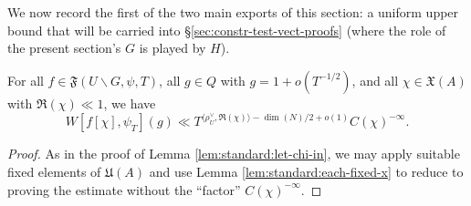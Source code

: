 We now record the first of the two main exports of this section: a uniform upper bound that will be carried into \S\ref{sec:constr-test-vect-proofs} (where the role of the present section's $G$ is played by $H$).
\begin{proposition}\label{lem:all-f-in}
  For all $f \in \mathfrak{F}(U \backslash G, \psi, T)$, all $g \in Q$ with $g = 1 + o(T^{-1/2})$, and all $\chi \in \mathfrak{X}(A)$ with $\Re(\chi) \ll 1$, we have
  \begin{equation}\label{eq:wfchi-psi_tg-ll}
    W[f[\chi], \psi_T](g)
    \ll T^{\langle \rho_U^\vee, \Re(\chi) \rangle - \dim(N)/2 + o(1)} C(\chi)^{-\infty}.
  \end{equation}
\end{proposition}
\begin{proof}
  As in the proof of Lemma \ref{lem:standard:let-chi-in}, we may apply suitable fixed elements of $\mathfrak{U}(A)$ and use Lemma \ref{lem:standard:each-fixed-x} to reduce to proving the estimate without the ``factor'' $C(\chi)^{-\infty}$.


\end{proof}
